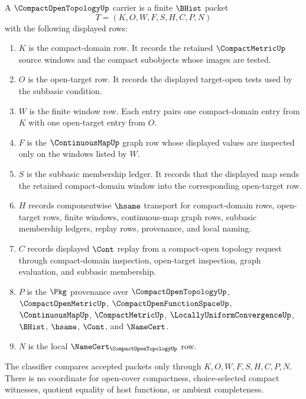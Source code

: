 \begin{definition}
\label{def:compact-open-topology-carrier}
A $\CompactOpenTopologyUp$ carrier is a finite $\BHist$ packet
$$
T=(K,O,W,F,S,H,C,P,N)
$$
with the following displayed rows:
\begin{enumerate}
\item $K$ is the compact-domain row. It records the retained $\CompactMetricUp$ source windows and the compact subobjects whose images are tested.
\item $O$ is the open-target row. It records the displayed target-open tests used by the subbasic condition.
\item $W$ is the finite window row. Each entry pairs one compact-domain entry from $K$ with one open-target entry from $O$.
\item $F$ is the $\ContinuousMapUp$ graph row whose displayed values are inspected only on the windows listed by $W$.
\item $S$ is the subbasic membership ledger. It records that the displayed map sends the retained compact-domain window into the corresponding open-target row.
\item $H$ records componentwise $\hsame$ transport for compact-domain rows, open-target rows, finite windows, continuous-map graph rows, subbasic membership ledgers, replay rows, provenance, and local naming.
\item $C$ records displayed $\Cont$ replay from a compact-open topology request through compact-domain inspection, open-target inspection, graph evaluation, and subbasic membership.
\item $P$ is the $\Pkg$ provenance over $\CompactOpenTopologyUp$, $\CompactOpenMetricUp$, $\CompactOpenFunctionSpaceUp$, $\ContinuousMapUp$, $\CompactMetricUp$, $\LocallyUniformConvergenceUp$, $\BHist$, $\hsame$, $\Cont$, and $\NameCert$.
\item $N$ is the local $\NameCert_{\CompactOpenTopologyUp}$ row.
\end{enumerate}
The classifier compares accepted packets only through $K,O,W,F,S,H,C,P,N$. There is no coordinate for open-cover compactness, choice-selected compact witnesses, quotient equality of host functions, or ambient completeness.
\end{definition}

